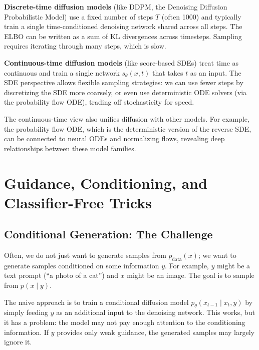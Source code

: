 \vspPara

\textbf{Discrete-time diffusion models} (like DDPM, the Denoising Diffusion Probabilistic Model) use a fixed number of steps $T$ (often 1000) and typically train a single time-conditioned denoising network shared across all steps. The ELBO can be written as a sum of KL divergences across timesteps. Sampling requires iterating through many steps, which is slow.

\vspPara

\textbf{Continuous-time diffusion models} (like score-based SDEs) treat time as continuous and train a single network $s_\theta(x,t)$ that takes $t$ as an input. The SDE perspective allows flexible sampling strategies: we can use fewer steps by discretizing the SDE more coarsely, or even use deterministic ODE solvers (via the probability flow ODE), trading off stochasticity for speed.

\vspPara

The continuous-time view also unifies diffusion with other models. For example, the probability flow ODE, which is the deterministic version of the reverse SDE, can be connected to neural ODEs and normalizing flows, revealing deep relationships between these model families.

\vspChapter

\section{Guidance, Conditioning, and Classifier-Free Tricks}
\label{sec:guidance}

\vspBlock

\subsection{Conditional Generation: The Challenge}

Often, we do not just want to generate samples from $p_{\text{data}}(x)$; we want to generate samples conditioned on some information $y$. For example, $y$ might be a text prompt (``a photo of a cat'') and $x$ might be an image. The goal is to sample from $p(x \mid y)$.

\vspPara

The naive approach is to train a conditional diffusion model $p_\theta(x_{t-1} \mid x_t, y)$ by simply feeding $y$ as an additional input to the denoising network. This works, but it has a problem: the model may not pay enough attention to the conditioning information. If $y$ provides only weak guidance, the generated samples may largely ignore it.

